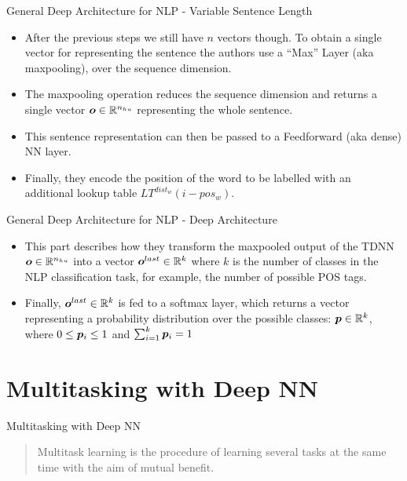 \documentclass[handout]{beamer} %
\begin{document}
  \begin{frame}{General Deep Architecture for NLP - Variable Sentence Length}
      \begin{itemize}[<+->]

        \item After the previous steps we still have $n$ vectors though.
            To obtain a single vector for representing the sentence the authors
            use a ``Max'' Layer (aka maxpooling), over the sequence dimension.
        \item The maxpooling operation reduces the sequence dimension and
            returns a single vector ${\bm{o}}\in{\mathbb{R}}^{n_{hu}}$ representing the whole
            sentence.
        \item This sentence representation can then be passed to a Feedforward
            (aka dense) NN layer.
          \item Finally, they encode the position of the word to be labelled
              with an additional lookup table $LT^{dist_w}(i-pos_w)$.
      \end{itemize}
  \end{frame}

  \begin{frame}{General Deep Architecture for NLP - Deep Architecture}
      \begin{itemize}[<+->]
          \item This part describes how they transform the maxpooled output of
              the TDNN ${\bm{o}}\in{\mathbb{R}}^{n_{hu}}$ into a vector ${\bm{o}}^{last}\in{\mathbb{R}}^k$
              where $k$ is the number of classes in the NLP classification task,
              for example, the number of possible POS tags.
          \item Finally, ${\bm{o}}^{last}\in{\mathbb{R}}^k$ is fed to a softmax layer, which
              returns a vector representing a probability distribution over the
              possible classes: ${\bm{p}}\in{\mathbb{R}}^k$, where $0\leq{\bm{p}}_i\leq1$ and
              $\sum_{i=1}^k{{\bm{p}}_i}=1$
      \end{itemize}
  \end{frame}

  \section{Multitasking with Deep NN}

  \begin{frame}{Multitasking with Deep NN}
  \begin{quote}
    Multitask learning is the procedure of learning several tasks at the same
    time with the aim of mutual benefit.
  \end{quote}

  \end{frame}
\end{document}
